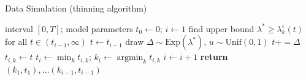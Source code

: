 \documentclass{article}
\newcommand{\pluseq}{\mathrel{+\!\!=}}
\DeclareMathOperator*{\argmin}{argmin}
\newcommand{\Uniform}{\mathrm{Unif}}
\newcommand{\Exp}{\mathrm{Exp}}
\begin{document}
\begin{algorithm}[tb]
	\caption{Data Simulation (thinning algorithm)}
	\label{alg:thinning}
	\begin{algorithmic}
	 interval $[0,T]$; model parameters
        \State $t_0\gets 0$; $i\gets 1$
		 
			 
				\State find upper bound $\lambda^* \geq \lambda_k^i(t)$ for all $t \in (t_{i-1},\infty)$
				\State $t \gets t_{i-1}$
					\Repeat
						\State draw $\Delta \sim \Exp(\lambda^*)$, $u \sim \Uniform(0,1)$
						\State $t \pluseq \Delta$ 
					 
                                \State $t_{i,k} \gets t$
			\EndFor
			\State $t_{i} \gets \min_{k} t_{i,k}$; $k_{i} \gets \argmin_{k} t_{i,k}$ 
                        \State $i \gets i+1$
		\EndWhile
        \State \textbf{return} $(k_1,t_1),\ldots(k_{i-1},t_{i-1})$
\end{algorithmic}
\end{algorithm}
\end{document}
